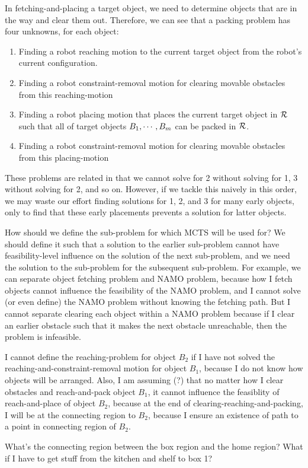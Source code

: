 \documentclass[10pt,letterpaper]{article}
\begin{document}
In fetching-and-placing a target object, we need to determine
objects that are in the way and clear them out. 
Therefore, we can see that a packing problem has
four unknowns, for each object:
\begin{enumerate}
\item Finding a robot reaching motion to the current target object
from the robot's current configuration. 
\item Finding a robot constraint-removal motion for clearing movable obstacles
from this reaching-motion
\item Finding a robot placing motion that places the current target
object in $\mathcal{R}$ such that all of target objects $B_1,\cdots,B_m$ can
be packed in $\mathcal{R}$.
\item Finding a robot constraint-removal motion for clearing movable obstacles
from this placing-motion
\end{enumerate}

These problems are related in that we cannot solve for 2 without solving for
1, 3 without solving for 2, and so on. However, if we tackle this naively in this 
order, we may waste our effort finding solutions 
for 1, 2, and 3 for many early objects, only to find 
that these early placements prevents a solution for latter objects. 


How should we define the sub-problem for which MCTS will be used for?
We should define it such that a solution to the earlier sub-problem
cannot have feasibility-level influence on the solution of the
next sub-problem, and we need the solution to the sub-problem
for the subsequent sub-problem. For example, we can separate object
fetching problem and NAMO problem, because how I fetch objects
cannot influence the feasibility of the NAMO problem, and
I cannot solve (or even define) the NAMO problem without knowing the fetching path.
But I cannot separate clearing each object within a NAMO problem
because if I clear an earlier obstacle such that it makes the
next obstacle unreachable, then the problem is infeasible.


I cannot define the reaching-problem for object $B_2$ if I have not
solved the reaching-and-constraint-removal motion for object $B_1$,
because I do not know how objects will be arranged. Also, I am assuming (?)
that no matter how I clear obstacles and reach-and-pack object $B_1$,
it cannot influence the feasiblity of reach-and-place of object $B_2$,
because at the end of clearing-reaching-and-packing, I will be at the
connecting region to $B_2$, because I ensure an existence of path
to a point in connecting region of $B_2$.

What's the connecting region between the box region and the home region?
What if I have to get stuff from the kitchen and shelf to box 1?
\fi
\fi



\end{document}
